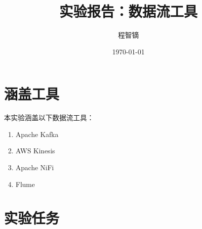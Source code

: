 \documentclass{article}
\title{实验报告：数据流工具}
\author{程智镝}
\date{\today}
\begin{document}
\maketitle

\section*{涵盖工具}

本实验涵盖以下数据流工具：

\begin{enumerate}
    \item Apache Kafka
    \item AWS Kinesis
    \item Apache NiFi
    \item Flume
\end{enumerate}

\section*{实验任务}
\end{document}
